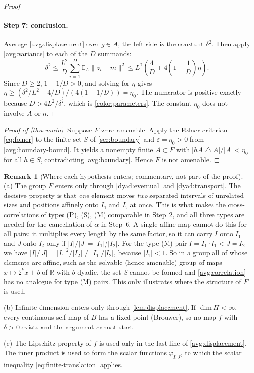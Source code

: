 \documentclass[11pt]{article}
\newcommand{\R}{\mathbb R}
\newcommand{\norm}[1]{\lVert #1\rVert}
\theoremstyle{definition}
\newtheorem{remark}[theorem]{Remark}
\numberwithin{equation}{section}
\begin{document}
\begin{proof}
\paragraph{Step 7: conclusion.}
Average \eqref{avg:displacement} over \(g\in A\); the left side is the
constant \(\delta^2\). Then apply \eqref{avg:variance} to each of the \(D\)
summands:
\[
  \delta^2
  \leq\frac{L^2}{D}\sum_{i=1}^D \mathbb E_A\norm{z_i-m}^2
  \leq L^2\left(\frac4D+4\left(1-\frac1D\right)\eta\right).
\]
Since \(D\ge2\), \(1-1/D>0\), and solving for \(\eta\) gives
\(\eta\ge(\delta^2/L^2-4/D)/(4(1-1/D))=\eta_0\). The numerator is positive
exactly because \(D>4L^2/\delta^2\), which is \eqref{color:parameters}. The
constant \(\eta_0\) does not involve \(A\) or \(n\).
\end{proof}

\begin{proof}[Proof of \cref{thm:main}]
Suppose \(F\) were amenable. Apply the F\o lner criterion
\eqref{eq:folner} to the finite set \(S\) of \cref{sec:boundary} and
\(\varepsilon=\eta_0>0\) from \eqref{avg:boundary-bound}. It yields a nonempty
finite \(A\subset F\) with \(|hA\mathbin{\triangle}A|/|A|<\eta_0\) for all
\(h\in S\), contradicting \cref{avg:boundary}. Hence \(F\) is not amenable.
\end{proof}

\begin{remark}[Where each hypothesis enters; commentary, not part of the proof]
\label{rem:hypotheses}
(a) The group \(F\) enters only through \cref{dyad:eventual} and
\cref{dyad:transport}. The decisive property is that \emph{one} element moves
\emph{two} separated intervals of unrelated sizes and positions affinely onto
\(I_1\) and \(I_2\) at once. This is what makes the cross-correlations of
types (P), (S), (M) comparable in Step~2, and all three types are needed for
the cancellation of \(\alpha\) in Step~6. A single affine map cannot do this
for all pairs: it multiplies every length by the same factor, so it can carry
\(I\) onto \(I_1\) and \(J\) onto \(I_2\) only if
\(|I|/|J|=|I_1|/|I_2|\). For the type (M) pair \(I=I_1\cdot I_1<J=I_2\) we
have \(|I|/|J|=|I_1|^2/|I_2|\ne|I_1|/|I_2|\), because \(|I_1|<1\). So in a
group all of whose elements are affine, such as the solvable (hence amenable)
group of maps \(x\mapsto2^kx+b\) of \(\R\) with \(b\) dyadic, the set \(S\)
cannot be formed and \eqref{avg:correlation} has no analogue for type (M)
pairs. This only illustrates where the structure of \(F\) is used.

(b) Infinite dimension enters only through \cref{lem:displacement}. If
\(\dim H<\infty\), every continuous self-map of \(B\) has a fixed point
(Brouwer), so no map \(f\) with \(\delta>0\) exists and the argument cannot
start.

(c) The Lipschitz property of \(f\) is used only in the last line of
\eqref{avg:displacement}. The inner product is used to form the scalar
functions \(\varphi_{I,J}\), to which the scalar inequality
\eqref{eq:finite-translation} applies.
\end{remark}
\end{document}

